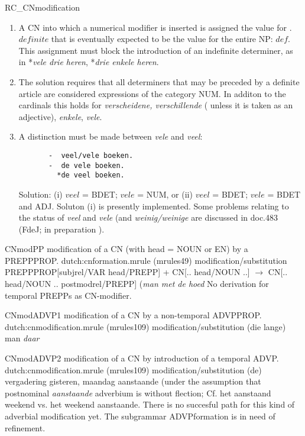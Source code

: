 \begin{mruleclass}{RC\_CNmodification}
\begin{members}
\begin{member}
\begin{enumerate}
\end{enumerate}

\remarks\mbox{}
\begin{enumerate}
\item 
A CN into which a numerical modifier is inserted is assigned the value 
for .$definite$ that is eventually expected to be the value for the entire NP: 
$def$. This assignment must block the introduction of an indefinite determiner, 
as in *{\em vele drie heren}, *{\em drie enkele heren}. 
\item 
The solution requires that all determiners that may be preceded by a definite 
article are considered expressions of the category NUM. 
In additon to the cardinals this holds for {\em verscheidene, verschillende} (
unless it is taken as an adjective), {\em enkele}, {\em vele}.
\item 
A distinction must be made between {\em vele} and {\em veel}:\\
\begin{verbatim}
       -  veel/vele boeken.
       -  de vele boeken.
         *de veel boeken.
\end{verbatim}
Solution:     (i) $veel$ = BDET; $vele$ = NUM, or 
              (ii) $veel$ = BDET; $vele$ = BDET and  ADJ.
Soluton (i) is presently implemented. Some problems relating to the status of {
\em veel} and {\em vele} (and {\em weinig/weinige} are discussed in doc.483 
(FdeJ; in 
preparation ).
\end{enumerate}

\end{member}
\begin{member}
 CNmodPP
 modification of a CN (with head = NOUN or EN) by a PREPPPROP.
\file dutch:cnformation.mrule (mrules49)
\semantics modification/substitution
\example PREPPPROP[subjrel/VAR head/PREPP] + CN[.. head/NOUN ..]
$\rightarrow$ CN[.. head/NOUN .. postmodrel/PREPP] 
({\em man met de hoed}
\remarks No derivation for temporal PREPPs as CN-modifier.
\end{member}

\begin{member}
 CNmodADVP1
 modification of a CN by a non-temporal ADVPPROP.
\file dutch:cnmodification.mrule (mrules109)
\semantics modification/substitution
\example (die lange) man {\em daar}
\remarks\mbox{}

\end{member}
\begin{member}
 CNmodADVP2
 modification of a CN by introduction of a temporal ADVP.
\file dutch:cnmodification.mrule (mrules109)
\semantics modification/substitution
\example (de) vergadering 
gisteren, maandag aanstaande (under the assumption that postnominal 
{\em aanstaande} 
adverbium is without flection; Cf.  het aanstaand weekend vs. het weekend 
aanstaande. 
\remarks There is no succesful  path for this kind of adverbial 
modification yet. 
The subgrammar ADVPformation is in need of refinement.
\end{member}


\end{members}
\end{mruleclass}
